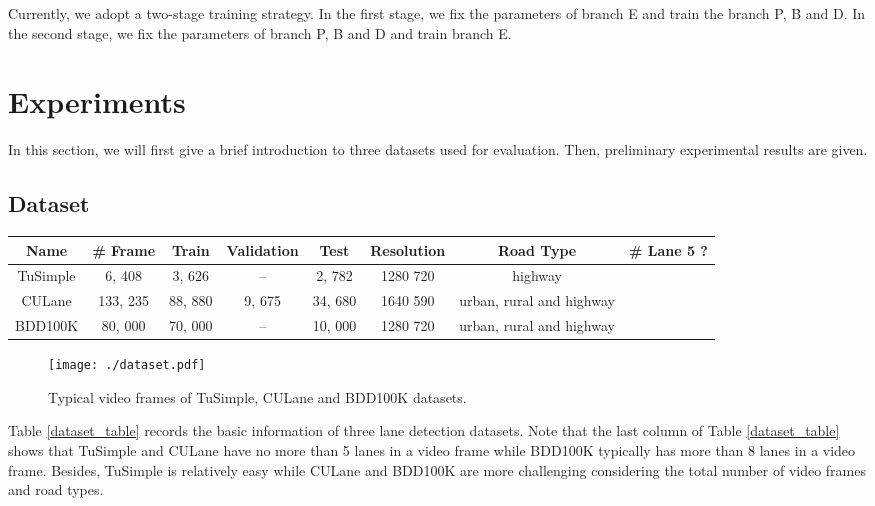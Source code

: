 \documentclass[draftcls]{IEEEtran}
\begin{document}
Currently, we adopt a two-stage training strategy. In the first stage, we fix the parameters of branch E and train the branch P, B and D. In the second stage, we fix the parameters of branch P, B and D and train branch E.

\section{Experiments}

In this section, we will first give a brief introduction to three datasets used for evaluation. Then, preliminary experimental results are given.

\subsection{Dataset}

\begin{table*}[!t]
\caption{A brief description about three lane detection datasets.}
\label{dataset_table}
\centering
\begin{tabular}{c|c|c|c|c|c|c|c}
\hline
Name & \# Frame & Train & Validation & Test & Resolution & Road Type & \# Lane  5 ? \\
\hline
TuSimple & 6, 408 & 3, 626 & -- & 2, 782 & 1280  720 & highway &  \\
\hline
CULane & 133, 235 & 88, 880 & 9, 675 & 34, 680 & 1640  590 & urban, rural and highway &  \\
\hline
BDD100K & 80, 000 & 70, 000 & -- & 10, 000 & 1280  720 & urban, rural and highway &  \\
\hline
\end{tabular}
\end{table*}

\begin{figure}[t]
  \centering
  \texttt{[image: ./dataset.pdf]}
  \vskip -0.2cm
  \caption{Typical video frames of TuSimple, CULane and BDD100K datasets.}
  \centering
  \label{fig:dataset}
\end{figure}

Table \ref{dataset_table} records the basic information of three lane detection datasets. Note that the last column of Table \ref{dataset_table} shows that TuSimple and CULane have no more than 5 lanes in a video frame while BDD100K typically has more than 8 lanes in a video frame. Besides, TuSimple is relatively easy while CULane and BDD100K are more challenging considering the total number of video frames and road types.  
\end{document}
